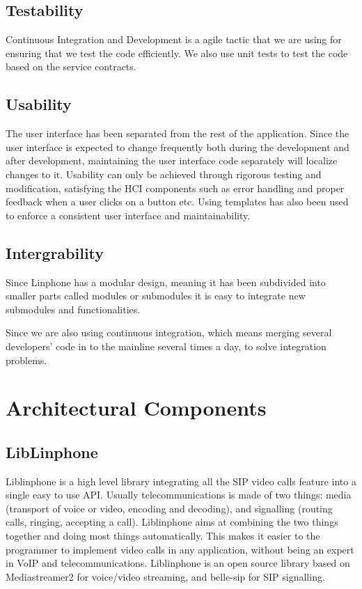 \documentclass[a4paper]{article}
\begin{document}
\subsection{Testability}

Continuous Integration and Development is a agile tactic that we are using for ensuring that we test the code efficiently. We also use unit tests to test the code based on the service contracts.

\subsection{Usability}

The user interface has been separated from the rest of the application. Since the user interface is expected to change frequently both during the development and after development, maintaining the user interface code separately will localize changes to it. Usability can only be achieved through rigorous testing and modification, satisfying the HCI components such as error handling and proper feedback when a user clicks on a button etc. Using templates has also been used to enforce a consistent user interface and maintainability.

\subsection{Intergrability}

Since Linphone has a modular design, meaning it has been subdivided into smaller parts called modules or submodules it is easy to integrate new submodules and functionalities.

Since we are also using continuous integration, which means merging several developers’ code in to the mainline several times a day, to solve integration problems.


\section{\textbf{Architectural Components}}

\subsection{LibLinphone}

Liblinphone is a high level library integrating all the SIP video calls feature into a single easy to use API. Usually telecommunications is made of two things: media (transport of voice or video, encoding and decoding), and signalling (routing calls, ringing, accepting a call).
Liblinphone aims at combining the two things together and doing most things automatically. This makes it easier to the programmer to implement video calls in any application, without being an expert in VoIP and telecommunications. Liblinphone is an open source library based on Mediastreamer2 for voice/video streaming, and belle-sip for SIP signalling.
\end{document}
